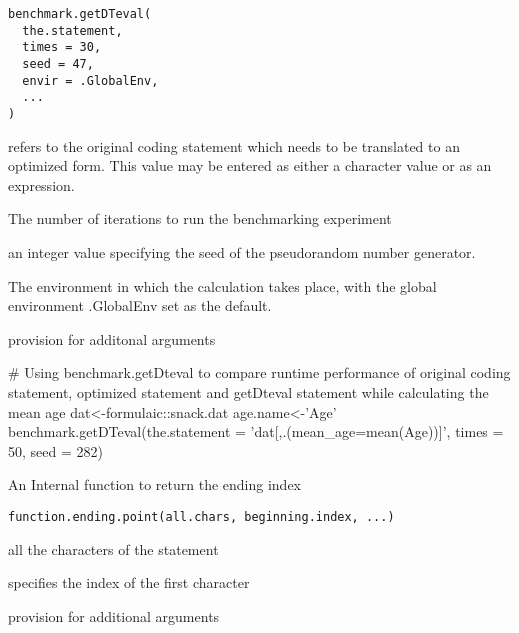 \documentclass[a4paper]{book}
\begin{document}
%
\begin{Usage}
\begin{verbatim}
benchmark.getDTeval(
  the.statement,
  times = 30,
  seed = 47,
  envir = .GlobalEnv,
  ...
)
\end{verbatim}
\end{Usage}
%
\begin{Arguments}
\begin{ldescription}
\item[\code{the.statement}] refers to the original coding statement which needs to be translated to an optimized form.  This value may be entered as either a character value or as an expression.

\item[\code{times}] The number of iterations to run the benchmarking experiment

\item[\code{seed}] an integer value specifying the seed of the pseudorandom number generator.

\item[\code{envir}] The environment in which the calculation takes place, with the global environment .GlobalEnv set as the default.

\item[\code{...}] provision for additonal arguments
\end{ldescription}
\end{Arguments}
%
\begin{Examples}
\begin{ExampleCode}
# Using benchmark.getDteval to compare runtime performance of original coding statement, optimized statement and getDteval statement while calculating the mean age
dat<-formulaic::snack.dat
age.name<-'Age'
benchmark.getDTeval(the.statement = 'dat[,.(mean_age=mean(Age))]', times = 50, seed = 282)
\end{ExampleCode}
\end{Examples}
%
\begin{Description}\relax
An Internal function to return the ending index
\end{Description}
%
\begin{Usage}
\begin{verbatim}
function.ending.point(all.chars, beginning.index, ...)
\end{verbatim}
\end{Usage}
%
\begin{Arguments}
\begin{ldescription}
\item[\code{all.chars}] all the characters of the statement

\item[\code{beginning.index}] specifies the index of the first character

\item[\code{...}] provision for additional arguments
\end{ldescription}
\end{Arguments}
\end{document}
